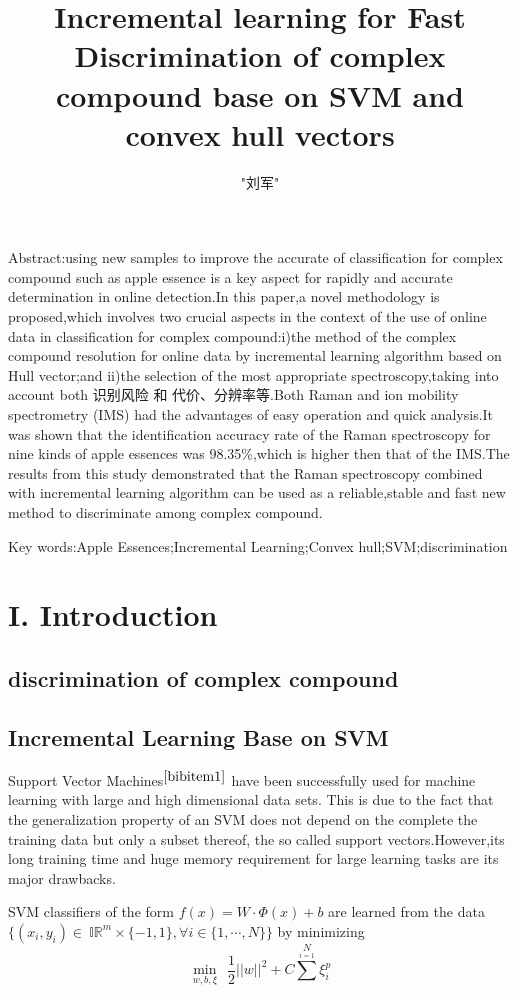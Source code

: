 \documentclass{article}
\author{"刘军"}
\title{Incremental learning for Fast Discrimination of complex compound base on SVM and convex hull vectors }
\begin{document}
\maketitle

Abstract:using new samples to improve the accurate of classification for complex compound such as apple essence is a key aspect for rapidly and accurate determination in online detection.In this paper,a novel methodology is proposed,which involves two crucial aspects in the context of the use of online data in classification for complex compound:i)the method of the complex compound resolution for online data by incremental learning algorithm based on Hull vector;and ii)the selection of the most appropriate spectroscopy,taking into account both 识别风险 和 代价、分辨率等.Both Raman and ion mobility spectrometry (IMS) had the advantages of easy operation and  quick  analysis.It was shown that the identification accuracy rate of the Raman spectroscopy for nine kinds of apple essences was 98.35\%,which is higher then that of the IMS.The results from this study demonstrated that the Raman spectroscopy combined with incremental learning algorithm can be used as a reliable,stable and fast new method to discriminate among complex compound.


Key words:Apple Essences;Incremental Learning;Convex hull;SVM;discrimination
\section{I. Introduction}

    \subsection{discrimination of complex compound}

    
    \subsection{Incremental Learning Base on SVM}
Support Vector Machines$ ^{\cite{bibitem1}}$ have been successfully used for machine learning with large and high dimensional data sets. This is due to the fact that the generalization property of an SVM does not depend on the complete the training data but only a subset thereof, the so called support vectors.However,its long training time and huge memory requirement for large learning tasks are its major drawbacks.

SVM classifiers of the form $f(x)=W\cdot\Phi(x)+b$ are learned from the data $\{ (x_i,y_i)\in\ \mathbb{IR}^m \times \{ -1, 1 \} ,\forall i \in \{ 1,\cdots,N \} \}$ by minimizing
\begin{equation}
\min \limits_{w,b,\xi} \ \ \frac{1}{2}||w||^2+C\sum^{N} \limits_{i=1}\xi^p_i \tag{1}
\end{equation}
\end{document}
